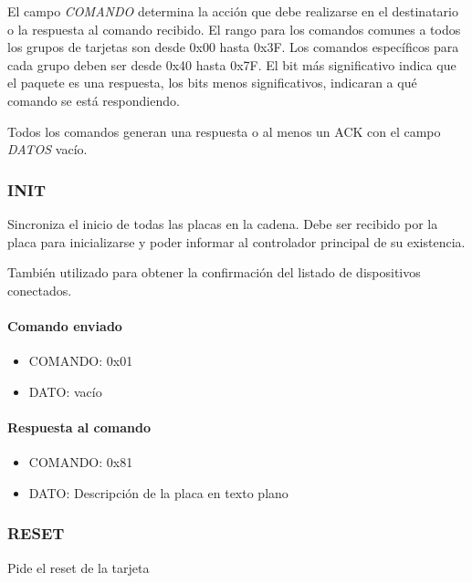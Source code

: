 El campo \emph{COMANDO} determina la acci\'on que debe realizarse en el destinatario o la respuesta al comando recibido.
El rango para los comandos comunes a todos los grupos de tarjetas son desde 0x00 hasta 0x3F.
Los comandos espec\'ificos para cada grupo deben ser desde 0x40 hasta 0x7F.
El bit m\'as significativo indica que el paquete es una respuesta, los bits menos significativos, indicaran a qu\'e comando se est\'a respondiendo.

Todos los comandos generan una respuesta o al menos un ACK con el campo \emph{DATOS} vac\'io.

\subsubsection{INIT}
\label{hA_protocolo_init}

Sincroniza el inicio de todas las placas en la cadena.
Debe ser recibido por la placa para inicializarse y poder informar al controlador principal de su existencia.

Tambi\'en utilizado para obtener la confirmaci\'on del listado de dispositivos conectados.

\paragraph*{Comando enviado}
\label{hA_protocolo_init_comando_enviado}

\begin{itemize}
	\item{COMANDO:} 0x01
	\item{DATO:} vac\'io
\end{itemize}

\paragraph*{Respuesta al comando}
\label{hA_protocolo_init_respuesta}

\begin{itemize}
	\item{COMANDO:} 0x81
	\item{DATO:} Descripci\'on de la placa en texto plano
\end{itemize}

\subsubsection{RESET}
\label{hA_protocolo_reset}

Pide el reset de la tarjeta


